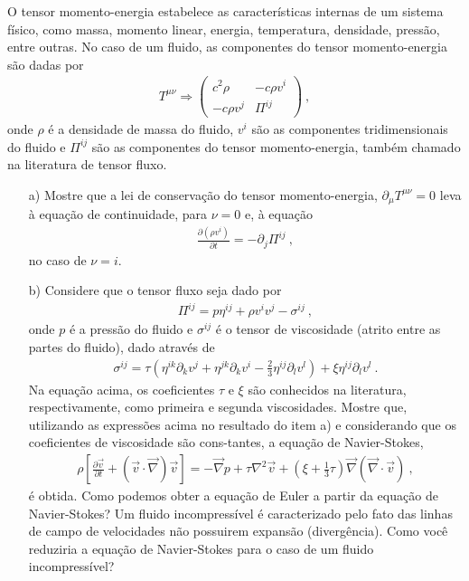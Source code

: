 \documentclass[a4paper,12pt]{article}
\begin{document}
\indent \par O tensor momento-energia estabelece as características internas de um sistema físico, como massa, momento linear, energia, temperatura, densidade, pressão, entre outras. No caso de um fluido, as componentes do tensor momento-energia são dadas por 
%
\begin{eqnarray}
  \nonumber
  T^{\mu \nu} \Rightarrow  
  \begin{pmatrix}
 c^2 \rho & -c\rho v^{i} \\
 -c\rho v^{j} & \Pi^{ij} 
\end{pmatrix}~,
%
 \end{eqnarray}
%
\noindent onde $\rho$ é a densidade de massa do fluido, $v^{i}$ são as componentes tridimensionais do fluido e $\Pi^{ij}$ são as componentes do tensor momento-energia, também chamado na literatura de tensor fluxo. 
%
\begin{itemize}
\item[a)] Mostre que a lei de conservação do tensor momento-energia, $\partial_{\mu} T^{\mu \nu}=0$ leva à equação de continuidade, para $\nu=0$ e, à equação
%
\begin{eqnarray}
  \nonumber
  \frac{\partial (\rho v^{i})}{\partial t} = -\partial_{j}\Pi^{ij} ~,
 \end{eqnarray}
%
\noindent no caso de $\nu = i$.
%
\item[b)] Considere que o tensor fluxo seja dado por 
%
\begin{eqnarray}
  \nonumber
  \Pi^{ij}=p\eta^{ij} + \rho v^{i}v^{j} - \sigma^{ij} ~,
 \end{eqnarray}
%
\noindent onde $p$ é a pressão do fluido e $\sigma^{ij}$ é o tensor de viscosidade (atrito entre as partes do fluido), dado através de 
%
\begin{eqnarray}
  \nonumber
  \sigma^{ij}= \tau \left(\eta^{ik}\partial_{k}v^{j} + \eta^{jk}\partial_{k}v^{i} - \frac{2}{3} \eta^{ij}\partial_{l}v^{l}\right) + \xi \eta^{ij}\partial_{l}v^{l} ~.
 \end{eqnarray}
%
\noindent Na equação acima, os coeficientes $\tau$ e $\xi$ são conhecidos na literatura, respectivamente, como primeira e segunda viscosidades. Mostre que, utilizando as expressões acima no resultado do item a) e considerando que os coeficientes de viscosidade são cons-tantes, a equação de Navier-Stokes, 
%
\begin{eqnarray}
  \nonumber
  \rho \left[ \frac{\partial \vec{v}}{\partial t} + (\vec{v}\cdot \vec{\nabla})\vec{v} \right]= -\vec{\nabla}p + \tau\nabla^2 \vec{v} + \left(\xi + \frac{1}{3}\tau\right)\vec{\nabla}(\vec{\nabla}\cdot \vec{v}) ~,
 \end{eqnarray}
%
\noindent é obtida. Como podemos obter a equação de Euler a partir da equação de Navier-Stokes? Um fluido incompressível é caracterizado pelo fato das linhas de campo de velocidades não possuirem expansão (divergência). Como você reduziria a equação de Navier-Stokes para o caso de um fluido incompressível?
%
\end{itemize}
\end{document}
